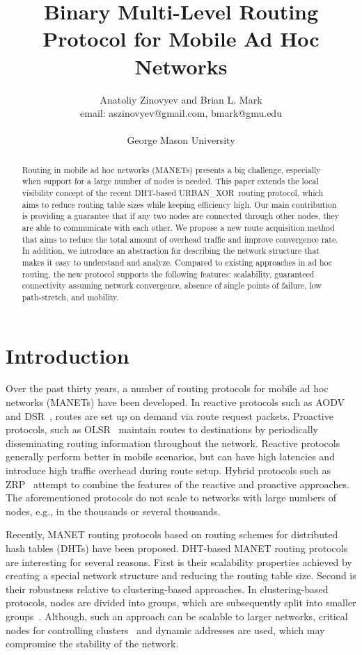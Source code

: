 \documentclass[conference]{IEEEtran}
\title{Binary Multi-Level Routing Protocol for Mobile Ad Hoc Networks}
\author{
  Anatoliy Zinovyev and Brian L. Mark \\
  email: aszinovyev@gmail.com, bmark@gmu.edu \\
   \\
  George Mason University \\
}
\theoremstyle{definition}
\newcommand{\urbanxor}{URBAN\_XOR}
\begin{document}
\maketitle

\begin{abstract}
Routing in mobile ad hoc networks (MANETs) presents a big challenge, especially when support for a large number of nodes is needed. This paper extends the local visibility concept of the recent DHT-based \urbanxor~routing protocol, which aims to reduce routing table sizes while keeping efficiency high. Our main contribution is providing a guarantee that if any two nodes are connected through other nodes, they are able to communicate with each other. We propose a new route acquisition method that aims to reduce the total amount of overhead traffic and improve convergence rate. In addition, we introduce an abstraction for describing the network structure that makes it easy to understand and analyze. Compared to existing approaches in ad hoc routing, the new protocol supports the following features: scalability, guaranteed connectivity assuming network convergence, absence of single points of failure, low path-stretch, and mobility.
\end{abstract}



\section{Introduction}
\label{sec:introduction}

Over the past thirty years, a number of routing protocols for mobile ad hoc networks (MANETs) have been developed.
In reactive protocols such as AODV~\cite{aodv} and DSR~\cite{dsr}, routes are set up  on demand via route request packets.  Proactive protocols, such as OLSR~\cite{olsr} maintain routes to destinations by periodically disseminating routing information throughout the network. Reactive protocols generally perform better in mobile scenarios, but can have high latencies and introduce high traffic overhead during route setup.  Hybrid protocols such as ZRP~\cite{zrp} attempt to combine the features of the reactive and proactive approaches.  The aforementioned protocols do not scale to networks with large numbers of nodes, e.g., in the thousands or several thousands. 
  
Recently, MANET routing protocols based on routing schemes for distributed hash tables (DHTs) have been proposed.  DHT-based MANET routing protocols  are interesting for several reasons. First is their scalability properties achieved by creating a special network structure and reducing the routing table size. Second is their robustness relative to clustering-based approaches. In clustering-based protocols, nodes are divided into groups, which are subsequently split into smaller groups~\cite{Hong}. Although, such an approach can be scalable to larger networks, critical nodes for controlling clusters~\cite{Hong} and dynamic addresses \cite{Hong,dart,ntk} are used, which may compromise the stability of the network.
\end{document}
